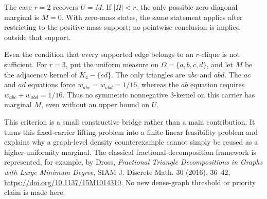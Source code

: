 The case $r=2$ recovers $U=M$.  If $|\Omega|<r$, the only possible
zero-diagonal marginal is $M=0$.  With zero-mass states, the same statement
applies after restricting to the positive-mass support; no pointwise
conclusion is implied outside that support.

Even the condition that every supported edge belongs to an $r$-clique is
not sufficient.  For $r=3$, put the uniform measure on
$\Omega=\{a,b,c,d\}$, and let $M$ be the adjacency kernel of
$K_4-\{cd\}$.  The only triangles are $abc$ and $abd$.  The $ac$ and $ad$
equations force $w_{abc}=w_{abd}=1/16$, whereas the $ab$ equation requires
$w_{abc}+w_{abd}=1/16$.  Thus no symmetric nonnegative $3$-kernel on this
carrier has marginal $M$, even without an upper bound on $U$.

This criterion is a small constructive bridge rather than a main
contribution.  It turns this fixed-carrier lifting problem into a finite
linear feasibility problem and explains why a graph-level density
counterexample cannot simply be reused as a higher-uniformity marginal.
The classical fractional-decomposition framework is represented, for
example, by Dross, \emph{Fractional Triangle Decompositions in Graphs with
Large Minimum Degree}, SIAM J. Discrete Math. 30 (2016), 36--42,
\url{https://doi.org/10.1137/15M1014310}.  No new dense-graph threshold or
priority claim is made here.
